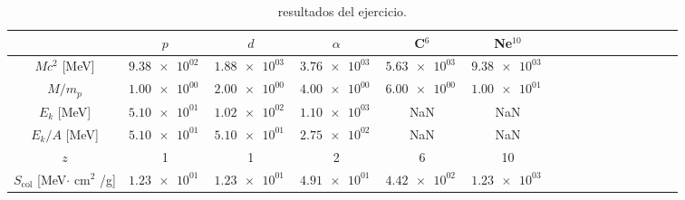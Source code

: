 \begin{table}
\caption{resultados del ejercicio.}
\label{Tab:02-ex05}
\begin{tabular}{cccccccccccccccc}
\toprule
 & $p$ & $d$ & $\alpha$ & C$^{6}$ & Ne$^{10}$ \\
\midrule
$Mc^2$ [MeV] & $\SI{9.38e+02}{}$ & $\SI{1.88e+03}{}$ & $\SI{3.76e+03}{}$ & $\SI{5.63e+03}{}$ & $\SI{9.38e+03}{}$ \\
$M/m_p$ & $\SI{1.00e+00}{}$ & $\SI{2.00e+00}{}$ & $\SI{4.00e+00}{}$ & $\SI{6.00e+00}{}$ & $\SI{1.00e+01}{}$ \\
$E_k$ [MeV] & $\SI{5.10e+01}{}$ & $\SI{1.02e+02}{}$ & $\SI{1.10e+03}{}$ & NaN & NaN \\
$E_k/A$ [MeV] & $\SI{5.10e+01}{}$ & $\SI{5.10e+01}{}$ & $\SI{2.75e+02}{}$ & NaN & NaN \\
$z$ & 1 & 1 & 2 & 6 & 10 \\
$S_{\text{col}}$ [MeV$\cdot$ cm$^2$ /g] & $\SI{1.23e+01}{}$ & $\SI{1.23e+01}{}$ & $\SI{4.91e+01}{}$ & $\SI{4.42e+02}{}$ & $\SI{1.23e+03}{}$ \\
\bottomrule
\end{tabular}
\end{table}
